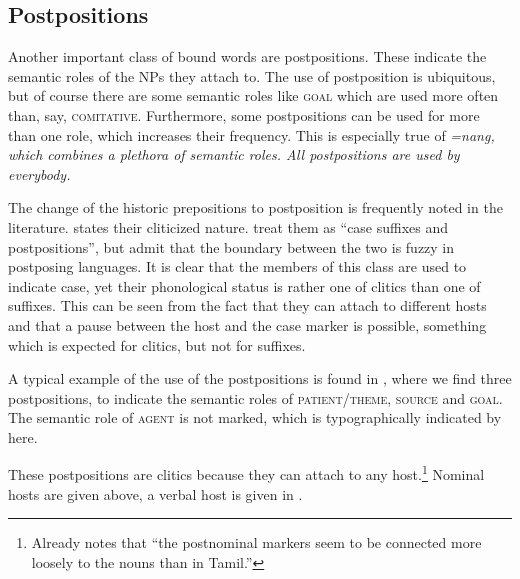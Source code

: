 \subsection{Postpositions}\label{sec:morph:Postpositions}
Another important class of bound words are postpositions. These indicate the semantic roles of the NPs they attach to. The use of postposition is ubiquitous, but of course there are some semantic roles like \textsc{goal} which are used more often than, say, \textsc{comitative}. Furthermore, some postpositions can be used for more than one role, which increases their frequency. This is especially true of \em =nang\em, which combines a plethora of semantic roles. All postpositions are used by everybody.

The change of the historic prepositions to postposition is frequently noted in the literature. \citet[30f]{Adelaar1991} states their cliticized nature. \citet{SmithEtAl2004} treat them as ``case suffixes and postpositions'', but admit that the boundary between the two is fuzzy in postposing languages. It is clear that the members of this class are used to indicate case, yet their phonological status is rather one of clitics than one of suffixes. This can be seen from the fact that they can attach to different hosts and that a pause between the host and the case marker is possible, something which is expected for clitics, but not for suffixes.

A typical example of the use of the postpositions is found in , where we find three postpositions, to indicate the semantic roles of \textsc{patient}/\textsc{theme}, \textsc{source} and \textsc{goal}. The semantic role of \textsc{agent} is not marked, which is typographically indicated by \zero{} here.


These postpositions are clitics because they can attach to any host.\footnote{Already \citet{Bakker2006} notes that ``the postnominal markers seem to be connected more loosely to the nouns \el{} than in Tamil.''} Nominal hosts are given above, a verbal host is given in  .


